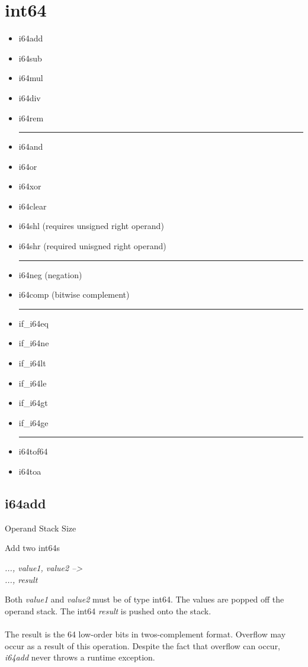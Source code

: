 \documentclass[12pt]{article}
\begin{document}
	\tableofcontents
	\newpage

	\section{int64}
		\begin{itemize}
			\item i64add
			\item i64sub
			\item i64mul
			\item i64div
			\item i64rem
			\\ \hrule
			\item i64and
			\item i64or
			\item i64xor
			\item i64clear
			\item i64shl (requires unsigned right operand)
			\item i64shr (required unisgned right operand)
			\\ \hrule
			\item i64neg (negation)
			\item i64comp (bitwise complement)
			\\ \hrule
			\item if\_i64eq
			\item if\_i64ne
			\item if\_i64lt
			\item if\_i64le
			\item if\_i64gt
			\item if\_i64ge
			\\ \hrule
			\item i64tof64
			\item i64toa
		\end{itemize}
		\newpage
		\subsection*{i64add}
			
			\begin{labeling}{Operand Stack Size}
				\item [\textbf{Operation}] Add two int64s
				\item [\textbf{Format}] 
				\item [\textbf{Operand Stack}] \textit{..., value1, value2 --\textgreater } \\
										\textit{..., result}
				\item [\textbf{Description}] Both \textit{value1} and \textit{value2} must be of type int64. The values are popped off the operand stack. The int64 \textit{result} is pushed onto the stack. \\ \\
				The result is the 64 low-order bits in twos-complement format. 
				Overflow may occur as a result of this operation. Despite the fact that overflow can occur, \textit{i64add} never throws a runtime exception. 			\end{labeling}
			
\end{document}
